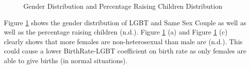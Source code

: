 \documentclass[
]{article}
\begin{document}
\begin{figure}
\caption{Gender Distribution and Percentage Raising Children Distribution}\label{fig:fig-gender-raising-children-distribution}
\end{figure}

Figure \ref{fig:fig-gender-raising-children-distribution} shows the gender distribution of LGBT and Same Sex Couple as well as well as the percentage raising children (n.d.).
Figure \ref{fig:fig-gender-raising-children-distribution} (a) and Figure \ref{fig:fig-gender-raising-children-distribution} (c) clearly shows that more females are non-heterosexual than male are (n.d.).
This could cause a lower BirthRate-LGBT coefficient on birth rate as only females are able to give births (in normal situations).
\end{document}
